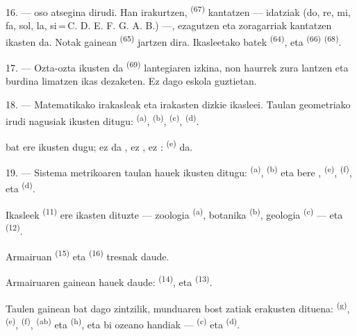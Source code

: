 16. ---  oso atsegina dirudi. Han  irakurtzen,
 \textsuperscript{(67)} kantatzen --- 
idatziak (do, re, mi, fa, sol, la, si\,=\,C. D. E. F. G. A. B.) ---,
 ezagutzen eta  zoragarriak kantatzen ikasten da.
Notak  gainean \textsuperscript{(65)} jartzen dira. Ikasleetako
batek  \textsuperscript{(64)}, eta
 \textsuperscript{(66)} 
\textsuperscript{(68)}.

17. --- Ozta-ozta ikusten da  \textsuperscript{(69)}
lantegiaren izkina, non haurrek zura lantzen eta burdina limatzen ikas
dezaketen. Ez dago eskola guztietan.

\VUsaut{5.0mm}
\VUsaut{3.6mm}

18. --- Matematikako irakasleak  
eta  irakasten dizkie ikasleei. Taulan geometriako
irudi nagusiak ikusten ditugu:  \textsuperscript{(a)},
 \textsuperscript{(b)}, 
\textsuperscript{(c)},  \textsuperscript{(d)}.

 bat ere ikusten dugu; ez da , ez
, ez : 
\textsuperscript{(e)} da.

19. --- Sistema metrikoaren taulan hauek ikusten ditugu: 
\textsuperscript{(a)},  \textsuperscript{(b)} eta bere
,  \textsuperscript{(e)}, 
\textsuperscript{(f)},  eta 
\textsuperscript{(d)}.

Ikasleek  \textsuperscript{(11)} ere ikasten dituzte ---
zoologia \textsuperscript{(a)}, botanika \textsuperscript{(b)}, geologia
\textsuperscript{(c)} --- eta  \textsuperscript{(12)}.

Armairuan  \textsuperscript{(15)} eta 
\textsuperscript{(16)} tresnak daude.

Armairuaren gainean hauek daude:  \textsuperscript{(14)},
 eta  \textsuperscript{(13)}.

Taulen gainean  bat dago zintzilik, munduaren bost zatiak
erakusten dituena:  \textsuperscript{(g)}, 
\textsuperscript{(e)},  \textsuperscript{(f)}, 
\textsuperscript{(ab)} eta  \textsuperscript{(h)}, eta bi ozeano
handiak ---  \textsuperscript{(c)} eta 
\textsuperscript{(d)}.
\VUsaut{6.0mm}
\VUfilet{22mm}
